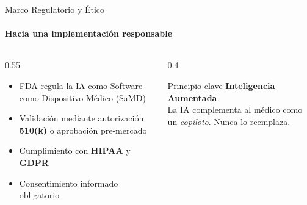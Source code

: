 \begin{frame}{Marco Regulatorio y Ético}
\framesubtitle{Hacia una implementación responsable}

\begin{columns}[T]
\begin{column}{0.55\textwidth}
\begin{itemize}
    \item \alert{FDA} regula la IA como Software como Dispositivo Médico (SaMD)
    \item Validación mediante autorización \textbf{510(k)} o aprobación pre-mercado
    \item Cumplimiento con \textbf{HIPAA} y \textbf{GDPR}
    \item Consentimiento informado obligatorio
\end{itemize}
\end{column}
\begin{column}{0.4\textwidth}
\begin{alertblock}{\faBalanceScale\; Principio clave}
\centering
\textbf{Inteligencia Aumentada}\\[4pt]
{\small La IA complementa al médico como un \emph{copiloto}. Nunca lo reemplaza.}
\end{alertblock}
\end{column}
\end{columns}

\end{frame}

